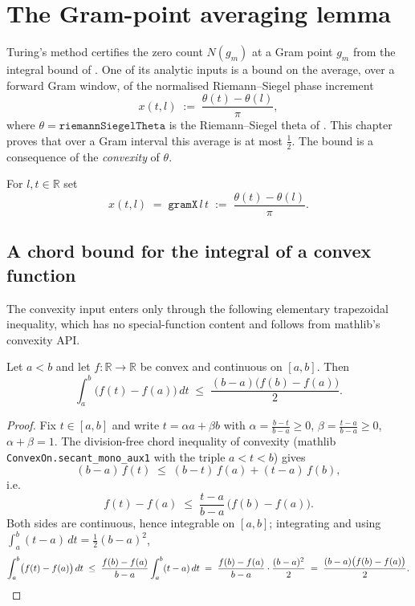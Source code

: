 %

\chapter{The Gram-point averaging lemma}
\label{cha:gram_averaging}

Turing's method certifies the zero count $N(g_m)$ at a Gram point $g_m$ from the
integral bound of . One of its analytic inputs is a bound on
the average, over a forward Gram window, of the normalised Riemann--Siegel phase
increment
\[
  x(t,l)\;:=\;\frac{\theta(t)-\theta(l)}{\pi},
\]
where $\theta=\texttt{riemannSiegelTheta}$ is the Riemann--Siegel theta of
. This chapter proves that over a Gram interval this average is at
most $\tfrac12$. The bound is a consequence of the \emph{convexity} of $\theta$.

\begin{definition}
\label{def:ga_x}
\leanok
For $l,t\in\mathbb{R}$ set
\[
  x(t,l)\;=\;\texttt{gramX}\,l\,t\;:=\;\frac{\theta(t)-\theta(l)}{\pi}.
\]
\end{definition}

\section{A chord bound for the integral of a convex function}
\label{sec:ga_chord}

The convexity input enters only through the following elementary trapezoidal
inequality, which has no special-function content and follows from mathlib's convexity
API.

\begin{lemma}
\label{lem:ga_chord}
\leanok
Let $a<b$ and let $f:\mathbb{R}\to\mathbb{R}$ be convex and continuous on $[a,b]$.
Then
\[
  \int_a^b\bigl(f(t)-f(a)\bigr)\,dt\;\le\;\frac{(b-a)\bigl(f(b)-f(a)\bigr)}{2}.
\]
\end{lemma}

\begin{proof}
\leanok
Fix $t\in[a,b]$ and write $t=\alpha a+\beta b$ with
$\alpha=\frac{b-t}{b-a}\ge0$, $\beta=\frac{t-a}{b-a}\ge0$, $\alpha+\beta=1$. The
division-free chord inequality of convexity (mathlib
\texttt{ConvexOn.secant\_mono\_aux1} with the triple $a<t<b$) gives
\[
  (b-a)\,f(t)\;\le\;(b-t)\,f(a)+(t-a)\,f(b),
\]
i.e.
\[
  f(t)-f(a)\;\le\;\frac{t-a}{b-a}\,\bigl(f(b)-f(a)\bigr).
\]
Both sides are continuous, hence integrable on $[a,b]$; integrating and using
$\int_a^b(t-a)\,dt=\tfrac12(b-a)^2$,
\[
  \int_a^b\bigl(f(t)-f(a)\bigr)\,dt
  \;\le\;\frac{f(b)-f(a)}{b-a}\int_a^b(t-a)\,dt
  \;=\;\frac{f(b)-f(a)}{b-a}\cdot\frac{(b-a)^2}{2}
  \;=\;\frac{(b-a)\bigl(f(b)-f(a)\bigr)}{2}. \qedhere
\]
\end{proof}

